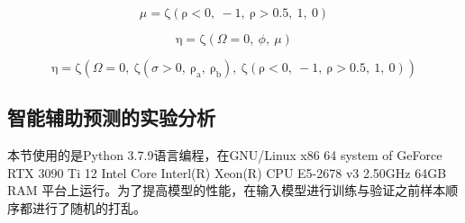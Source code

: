 \begin{equation}\label{paper5preC}
\mu=\mathrm{\zeta}(\mathrm{\rho}<0,~-1,~\mathrm{\rho}>0.5,~1,~0)
\end{equation}

\begin{equation}\label{paper5pre}
\mathrm{\eta}=\mathrm{\zeta}(\Omega=0,~\phi,~\mu)
\end{equation}
\fi

\begin{equation}\label{paper5pre}
\mathrm{\eta}=\mathrm{\zeta}(\Omega=0,~\mathrm{\zeta}(\sigma>0,~\mathrm{\rho_{a}},~\mathrm{\rho_{b}}),~\mathrm{\zeta}(\mathrm{\rho}<0,~-1,~\mathrm{\rho}>0.5,~1,~0))
\end{equation}



\subsection{智能辅助预测的实验分析}
本节使用的是Python 3.7.9语言编程，在GNU/Linux x86 64 system of GeForce RTX 3090 Ti 12 Intel Core Interl(R) Xeon(R) CPU E5-2678 v3 2.50GHz 64GB RAM 平台上运行。为了提高模型的性能，在输入模型进行训练与验证之前样本顺序都进行了随机的打乱。

